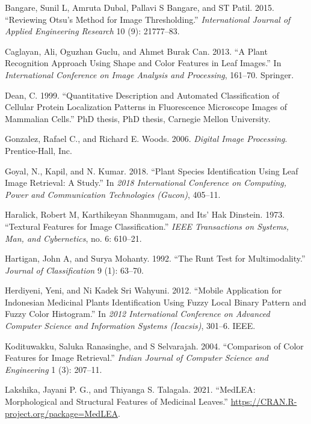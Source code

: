\documentclass{article}
\begin{document}
\leavevmode\hypertarget{ref-bangare2015reviewing}{}%
Bangare, Sunil L, Amruta Dubal, Pallavi S Bangare, and ST Patil. 2015.
``Reviewing Otsu's Method for Image Thresholding.'' \emph{International
Journal of Applied Engineering Research} 10 (9): 21777--83.

\leavevmode\hypertarget{ref-inproceedings1}{}%
Caglayan, Ali, Oguzhan Guclu, and Ahmet Burak Can. 2013. ``A Plant
Recognition Approach Using Shape and Color Features in Leaf Images.'' In
\emph{International Conference on Image Analysis and Processing},
161--70. Springer.

\leavevmode\hypertarget{ref-article31}{}%
Dean, C. 1999. ``Quantitative Description and Automated Classification
of Cellular Protein Localization Patterns in Fluorescence Microscope
Images of Mammalian Cells.'' PhD thesis, PhD thesis, Carnegie Mellon
University.

\leavevmode\hypertarget{ref-book1}{}%
Gonzalez, Rafael C., and Richard E. Woods. 2006. \emph{Digital Image
Processing}. Prentice-Hall, Inc.

\leavevmode\hypertarget{ref-8675114}{}%
Goyal, N., Kapil, and N. Kumar. 2018. ``Plant Species Identification
Using Leaf Image Retrieval: A Study.'' In \emph{2018 International
Conference on Computing, Power and Communication Technologies (Gucon)},
405--11.

\leavevmode\hypertarget{ref-articletx}{}%
Haralick, Robert M, Karthikeyan Shanmugam, and Its' Hak Dinstein. 1973.
``Textural Features for Image Classification.'' \emph{IEEE Transactions
on Systems, Man, and Cybernetics}, no. 6: 610--21.

\leavevmode\hypertarget{ref-hartigan1992runt}{}%
Hartigan, John A, and Surya Mohanty. 1992. ``The Runt Test for
Multimodality.'' \emph{Journal of Classification} 9 (1): 63--70.

\leavevmode\hypertarget{ref-inproceedings}{}%
Herdiyeni, Yeni, and Ni Kadek Sri Wahyuni. 2012. ``Mobile Application
for Indonesian Medicinal Plants Identification Using Fuzzy Local Binary
Pattern and Fuzzy Color Histogram.'' In \emph{2012 International
Conference on Advanced Computer Science and Information Systems
(Icacsis)}, 301--6. IEEE.

\leavevmode\hypertarget{ref-colarticle1}{}%
Kodituwakku, Saluka Ranasinghe, and S Selvarajah. 2004. ``Comparison of
Color Features for Image Retrieval.'' \emph{Indian Journal of Computer
Science and Engineering} 1 (3): 207--11.

\leavevmode\hypertarget{ref-medlea}{}%
Lakshika, Jayani P. G., and Thiyanga S. Talagala. 2021. ``MedLEA:
Morphological and Structural Features of Medicinal Leaves.''
\url{https://CRAN.R-project.org/package=MedLEA}.
\end{document}

